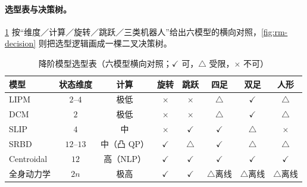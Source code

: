\paragraph{选型表与决策树。}
\cref{tab:rm-select} 按“维度／计算／旋转／跳跃／三类机器人”给出六模型的横向对照，\cref{fig:rm-decision} 则把选型逻辑画成一棵二叉决策树。

\begin{table}[H]\centering\small
\caption{降阶模型选型表（六模型横向对照；$\checkmark$ 可，$\triangle$ 受限，$\times$ 不可）}
\label{tab:rm-select}
\begin{tabular}{lccccccc}
\toprule
模型 & 状态维度 & 计算 & 旋转 & 跳跃 & 四足 & 双足 & 人形 \\
\midrule
LIPM       & $2$–$4$  & 极低 & $\times$ & $\times$ & $\triangle$ & $\checkmark$ & $\triangle$ \\
DCM        & $2$      & 极低 & $\times$ & $\times$ & $\triangle$ & $\checkmark$ & $\triangle$ \\
SLIP       & $4$      & 中   & $\times$ & $\checkmark$ & $\checkmark$ & $\triangle$ & $\times$ \\
SRBD       & $12$–$13$& 中（凸 QP） & $\checkmark$ & $\triangle$ & $\checkmark$ & $\triangle$ & $\triangle$ \\
Centroidal & $12$     & 高（NLP） & $\checkmark$ & $\checkmark$ & $\checkmark$ & $\checkmark$ & $\checkmark$ \\
全身动力学  & $2n$     & 极高 & $\checkmark$ & $\checkmark$ & $\triangle$离线 & $\triangle$离线 & $\triangle$离线 \\
\bottomrule
\end{tabular}
\end{table}

